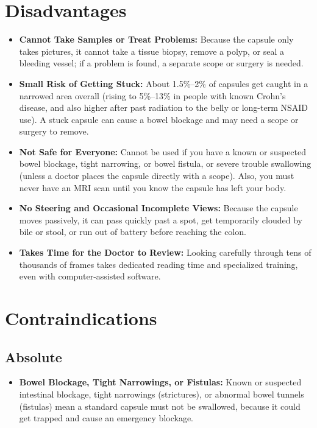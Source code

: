 \section{Disadvantages}
\begin{itemize}
    \item \textbf{Cannot Take Samples or Treat Problems:} Because the capsule only takes pictures, it cannot take a tissue biopsy, remove a polyp, or seal a bleeding vessel; if a problem is found, a separate scope or surgery is needed.
    \item \textbf{Small Risk of Getting Stuck:} About 1.5\%--2\% of capsules get caught in a narrowed area overall (rising to 5\%--13\% in people with known Crohn's disease, and also higher after past radiation to the belly or long-term NSAID use). A stuck capsule can cause a bowel blockage and may need a scope or surgery to remove.
    \item \textbf{Not Safe for Everyone:} Cannot be used if you have a known or suspected bowel blockage, tight narrowing, or bowel fistula, or severe trouble swallowing (unless a doctor places the capsule directly with a scope). Also, you must never have an MRI scan until you know the capsule has left your body.
    \item \textbf{No Steering and Occasional Incomplete Views:} Because the capsule moves passively, it can pass quickly past a spot, get temporarily clouded by bile or stool, or run out of battery before reaching the colon.
    \item \textbf{Takes Time for the Doctor to Review:} Looking carefully through tens of thousands of frames takes dedicated reading time and specialized training, even with computer-assisted software.
\end{itemize}

\section{Contraindications}

\subsection{Absolute}
\begin{itemize}
    \item \textbf{Bowel Blockage, Tight Narrowings, or Fistulas:} Known or suspected intestinal blockage, tight narrowings (strictures), or abnormal bowel tunnels (fistulas) mean a standard capsule must not be swallowed, because it could get trapped and cause an emergency blockage.
\end{itemize}

